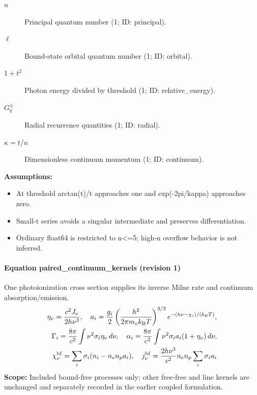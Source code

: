 \begin{description}
\item[$n$] Principal quantum number (1; ID: principal).
\item[$\ell$] Bound-state orbital quantum number (1; ID: orbital).
\item[$1+t^2$] Photon energy divided by threshold (1; ID: relative\_energy).
\item[$G_q^\pm$] Radial recurrence quantities (1; ID: radial).
\item[$\kappa=t/n$] Dimensionless continuum momentum (1; ID: continuum).
\end{description}

\noindent\textbf{Assumptions:}
\begin{itemize}
\item At threshold arctan(t)/t approaches one and exp(-2pi/kappa) approaches zero.
\item Small-t series avoids a singular intermediate and preserves differentiation.
\item Ordinary float64 is restricted to n<=5; high-n overflow behavior is not inferred.
\end{itemize}

\paragraph{Equation paired\_continuum\_kernels (revision 1)}
One photoionization cross section supplies its inverse Milne rate and continuum absorption/emission.
\begin{equation}
\begin{aligned}
\eta_\nu=\frac{c^2J_\nu}{2h\nu^3},\quad
 a_i=\frac{g_i}{2}\left(\frac{h^2}{2\pi m_e k_{\rm B}T}\right)^{3/2}
 e^{-(h\nu-\chi_i)/(k_{\rm B}T)},\\
\Gamma_i=\frac{8\pi}{c^2}\int\nu^2\sigma_i\eta_\nu\,d\nu,\quad
\alpha_i=\frac{8\pi}{c^2}\int\nu^2\sigma_i a_i(1+\eta_\nu)\,d\nu,\\
\chi_\nu^{\rm bf}=\sum_i\sigma_i(n_i-n_en_pa_i),\quad
j_\nu^{\rm bf}=\frac{2h\nu^3}{c^2}n_en_p\sum_i\sigma_i a_i
\end{aligned}
\label{eq:escape.cloudy_5f_investigation:paired_5f_continuum_5f_kernels:1}
\end{equation}
\noindent\textbf{Scope:} Included bound-free processes only; other free-free and line kernels are unchanged and separately recorded in the earlier coupled formulation.

